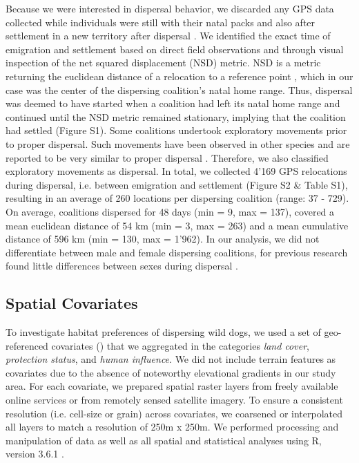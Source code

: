 \documentclass[abstract=on,10pt,a4paper,bibliography=totocnumbered]{article}
\begin{document}
Because we were interested in dispersal behavior, we discarded any GPS data
collected while individuals were still with their natal packs and also after
settlement in a new territory after dispersal \citep{Cozzi.2020}. We identified
the exact time of emigration and settlement based on direct field observations
and through visual inspection of the net squared displacement (NSD) metric. NSD
is a metric returning the euclidean distance of a relocation to a reference
point \citep{Borger.2012}, which in our case was the center of the dispersing
coalition's natal home range. Thus, dispersal was deemed to have started when a
coalition had left its natal home range and continued until the NSD metric
remained stationary, implying that the coalition had settled (Figure S1). Some
coalitions undertook exploratory movements prior to proper dispersal. Such
movements have been observed in other species and are reported to be very
similar to proper dispersal \citep{Killeen.2014}. Therefore, we also classified
exploratory movements as dispersal. In total, we collected 4'169 GPS relocations
during dispersal, i.e. between emigration and settlement (Figure S2 \& Table
S1), resulting in an average of 260 locations per dispersing coalition (range:
37 - 729). On average, coalitions dispersed for 48 days (min = 9, max = 137),
covered a mean euclidean distance of 54 km (min = 3, max = 263) and a mean
cumulative distance of 596 km (min = 130, max = 1'962). In our analysis, we did
not differentiate between male and female dispersing coalitions, for previous
research found little differences between sexes during dispersal
\citep{Woodroffe.2019, Cozzi.2020}.

\subsection{Spatial Covariates}
To investigate habitat preferences of dispersing wild dogs, we used a set of
geo-referenced covariates () that we aggregated in the
categories \textit{land cover}, \textit{protection status}, and \textit{human
influence}. We did not include terrain features as covariates due to the absence
of noteworthy elevational gradients in our study area. For each covariate, we
prepared spatial raster layers from freely available online services or from
remotely sensed satellite imagery. To ensure a consistent resolution (i.e.
cell-size or grain) across covariates, we coarsened or interpolated all layers
to match a resolution of 250m x 250m. We performed processing and manipulation
of data as well as all spatial and statistical analyses using R, version 3.6.1
\citep{R.2019}.
\end{document}
